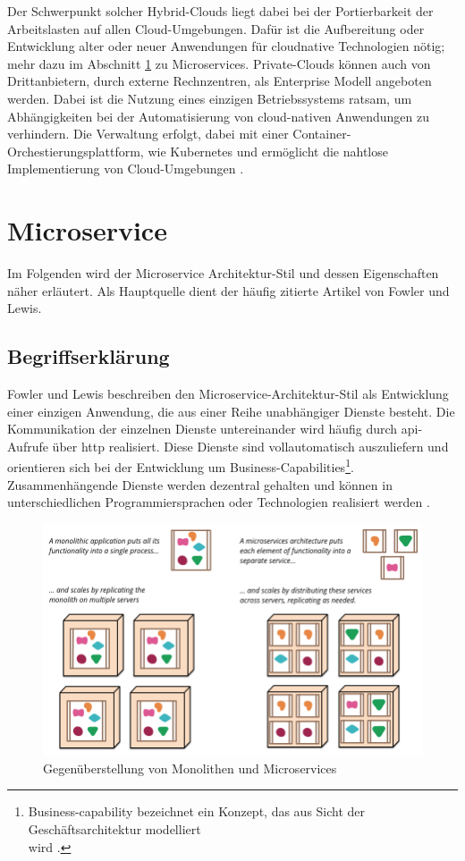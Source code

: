 Der Schwerpunkt solcher Hybrid-Clouds liegt dabei bei der Portierbarkeit der Arbeitslasten auf allen Cloud-Umgebungen.
Dafür ist die Aufbereitung oder Entwicklung alter oder neuer Anwendungen für cloudnative Technologien nötig; mehr dazu im Abschnitt \ref{Microservice} zu Microservices.
Private-Clouds können auch von Drittanbietern, durch externe Rechnzentren, als Enterprise Modell angeboten werden. Dabei ist die Nutzung eines einzigen Betriebssystems ratsam, um Abhängigkeiten bei der Automatisierung von cloud-nativen Anwendungen zu verhindern.
Die Verwaltung erfolgt, dabei mit einer Container-Orchestierungsplattform, wie Kubernetes und ermöglicht die nahtlose Implementierung von Cloud-Umgebungen \cite{ibmHybrid}.

\section{Microservice}\label{Microservice}
Im Folgenden wird der Microservice Architektur-Stil und dessen Eigenschaften näher erläutert.
Als Hauptquelle dient der häufig zitierte Artikel \cite{FowlerMicroservice} von Fowler und Lewis.

\subsection{Begriffserklärung}
Fowler und Lewis beschreiben den Microservice-Architektur-Stil als Entwicklung einer einzigen Anwendung, die aus einer Reihe unabhängiger Dienste besteht. 
Die Kommunikation der einzelnen Dienste untereinander wird häufig durch \acs{api}-Aufrufe über \acs{http} realisiert. 
Diese Dienste sind vollautomatisch auszuliefern und orientieren sich bei der Entwicklung um Business-Capabilities\footnote{Business-capability bezeichnet ein Konzept, das aus Sicht der Geschäftsarchitektur modelliert \\ wird \cite{MicroservicePattern}.}. 
Zusammenhängende Dienste werden dezentral gehalten und können in unterschiedlichen Programmiersprachen oder Technologien realisiert werden \cite{FowlerMicroservice}.

\begin{figure}[!htb]
  \centering
  \includegraphics[width=0.8\columnwidth]{images/MonolithsAndMicroservices.png}
  \caption{Gegenüberstellung von Monolithen und Microservices \cite{FowlerMicroservice}}
  \label{fig:monlithmicroservice}
\end{figure}

